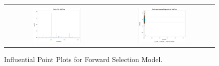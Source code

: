 \documentclass[11pt]{scrartcl} %
\begin{document}
\begin{figure}[H] %
	\centering
	\begin{tabular}{p{} p{}}
\hline	
	\multicolumn{1}{|c}{} &  \multicolumn{1}{c|}{} \\
		\multicolumn{1}{|c}{\includegraphics[width=0.48\textwidth]{../graphics/A2FWcooks}} &
		\multicolumn{1}{c|}{\includegraphics[width=0.48\textwidth]{../graphics/A2FWlev}}\\
		\hline
	\end{tabular}		
	\caption{Influential Point Plots for Forward Selection Model.} %
	\label{fig:A2FWIP}
\end{figure}
\end{document}
